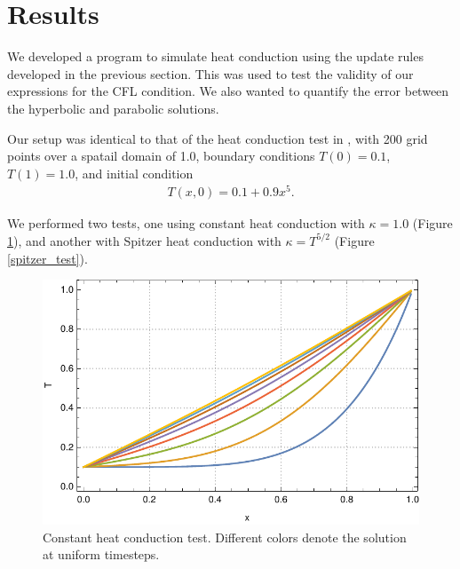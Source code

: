 \documentclass[iop]{emulateapj}
\begin{document}
	\section{Results}
	
		We developed a program to simulate heat conduction using the update rules developed in the previous section.
			This was used to test the validity of our expressions for the CFL condition.
			We also wanted to quantify the error between the hyperbolic and parabolic solutions.
			
		Our setup was identical to that of the heat conduction test in \cite{A}, with 200 grid points over a spatail domain of 1.0, boundary conditions $T(0) = 0.1$, $T(1) = 1.0$, and initial condition
		\begin{align}
			T(x,0) = 0.1 + 0.9 x^5.
		\end{align} 
	
		We performed two tests, one using constant heat conduction with $\kappa = 1.0$ (Figure \ref{linear_test}), and another with Spitzer heat conduction with $\kappa = T^{5/2}$ (Figure \ref{spitzer_test}).
	
		\begin{figure}[h!]
			\centering
			\includegraphics[width=\columnwidth]{figures/T_linear}
			\caption{Constant heat conduction test. Different colors denote the solution at uniform timesteps.}
			\label{linear_test}
		\end{figure}
		
\end{document}
